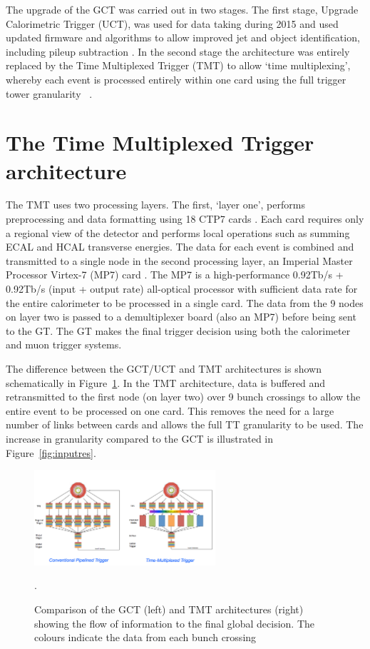 The upgrade of the GCT was carried out in two stages. The first stage,
Upgrade Calorimetric Trigger (UCT), was used for data taking during 2015
and used updated firmware and algorithms to allow improved jet and object 
identification, including pileup subtraction \cite{uct}. In the second stage the 
architecture was entirely replaced by the Time Multiplexed Trigger (TMT) 
to allow `time multiplexing', whereby each
event is processed entirely within one card using the full trigger tower granularity
~\cite{tmt}. 

\section{The Time Multiplexed Trigger architecture}

The TMT uses two processing layers. The first, `layer one', performs
preprocessing and data formatting using 18 CTP7 cards \cite{mp7}. Each card requires
only a regional view of the detector and performs local operations such as summing 
ECAL and HCAL transverse energies. The data for each event is combined and transmitted to 
a single node in the second processing layer, an Imperial Master Processor Virtex-7 (MP7) card \cite{mp7}. 
The MP7 is a high-performance 0.92Tb/s + 0.92Tb/s (input + output rate) all-optical processor 
with sufficient data rate for the entire calorimeter to be processed in a single card. The data 
from the 9 nodes on layer two is passed to a demultiplexer board (also an MP7) before
being sent to the GT. The GT makes the final trigger decision using both the calorimeter
and muon trigger systems.

The difference between the GCT/UCT and TMT architectures is shown schematically in Figure~\ref{tmux}. 
In the TMT architecture, data is buffered and retransmitted to the first node (on layer two)
over 9 bunch crossings to allow the entire event to be processed on one card. This
removes the need for a large number of links between cards and allows the full TT granularity to be used. The increase in granularity compared to the GCT is
illustrated in Figure~\ref{fig:inputres}. 

\begin{figure}

\centering
    \includegraphics[width=0.6\textwidth]{./Figures/triggerUpgrade/tmux}
  \caption{Comparison of the GCT (left) and TMT architectures (right) showing the flow of information
  to the final global decision. The colours indicate the data from each bunch crossing~\cite{tmt}}.
  \label{tmux}
\end{figure}

